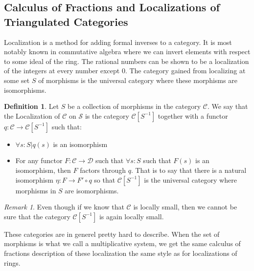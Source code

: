 \documentclass[12pt]{article}
\theoremstyle{definition}
\newtheorem{definition}{Definition}[section]
\theoremstyle{remark}
\newtheorem*{remark}{Remark}
\begin{document}
        \subsection{Calculus of Fractions and Localizations of Triangulated Categories}
            Localization is a method for adding formal inverses to a category. It is most notably known in commutative algebra where we can invert elements with respect to some ideal of the ring. The rational numbers can be shown to be a localization of the integers at every number except 0. The category gained from localizing at some set $S$ of morphisms is the universal category where these morphisms are isomorphisms.
            \begin{definition}
                Let $S$ be a collection of morphisms in the category $\mathcal{C}$. We say that the Localization of $\mathcal{C}$ on $\mathcal{S}$ is the category $\mathcal{C}[S^{-1}]$ together with a functor $q:\mathcal{C}\rightarrow \mathcal{C}[S^{-1}]$ such that:
                \begin{itemize}
                    \item $\forall s:S|q(s)$ is an isomorphism
                    \item For any functor $F:\mathcal{C}\rightarrow\mathcal{D}$ such that $\forall s:S$ such that $F(s)$ is an isomorphism, then $F$ factors through $q$. That is to say that there is a natural isomorphism $\eta : F\rightarrow F'\circ q$ so that $\mathcal{C}[S^{-1}]$ is the universal category where morphisms in $S$ are isomorphisms.
                \end{itemize}
                \begin{center}
                \end{center}
            \end{definition}

            \begin{remark}
                Even though if we know that $\mathcal{C}$ is locally small, then we cannot be sure that the category $\mathcal{C}[S^{-1}]$ is again locally small.
            \end{remark}

            These categories are in generel pretty hard to describe. When the set of morphisms is what we call a multiplicative system, we get the same calculus of fractions description of these localization the same style as for localizations of rings.
\end{document}
